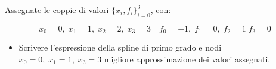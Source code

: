 Assegnate le coppie di valori $\{x_i,f_i \}_{i=0}^3$, con:

\[ x_0=0, \; x_1=1, \; x_2=2, \; x_3=3 \quad f_0=-1, \; f_1=0, \; f_2=1 \; f_3=0 \]

\begin{itemize}
\item Scrivere l'espressione della spline di primo grado e
nodi $x_0=0, \; x_1=1,\; x_3=3$  migliore approssimazione dei
valori assegnati.
\end{itemize}

